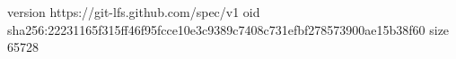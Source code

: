 version https://git-lfs.github.com/spec/v1
oid sha256:22231165f315ff46f95fcce10e3c9389c7408c731efbf278573900ae15b38f60
size 65728
